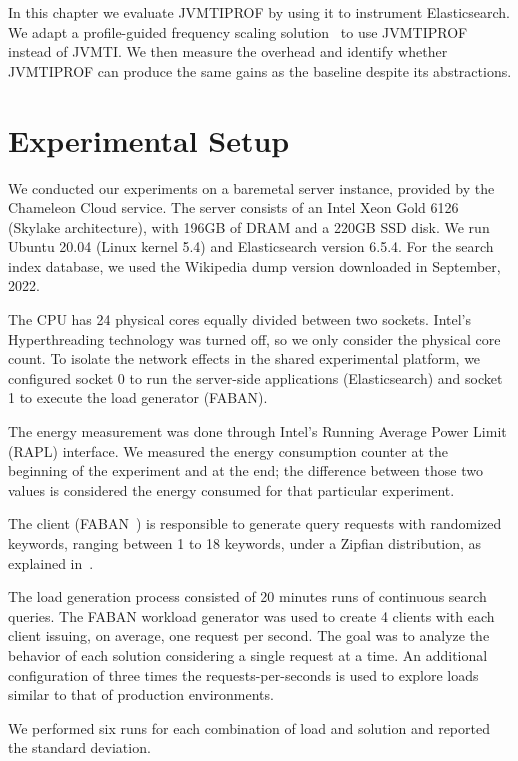 \label{cap:evaluation}

In this chapter we evaluate JVMTIPROF by using it to instrument Elasticsearch. We adapt a profile-guided frequency scaling solution~\cite{hurryupccgrid} to use JVMTIPROF instead of JVMTI. We then measure the overhead and identify whether JVMTIPROF can produce the same gains as the baseline despite its abstractions.

\section{Experimental Setup}

We conducted our experiments on a baremetal server instance, provided by the Chameleon Cloud service. The server consists of an Intel Xeon Gold 6126 (Skylake architecture), with 196GB of DRAM and a 220GB SSD disk.  We run Ubuntu 20.04 (Linux kernel 5.4) and Elasticsearch version 6.5.4. For the search index database, we used the Wikipedia dump version  downloaded in September, 2022.

The CPU has 24 physical cores equally divided between two sockets. Intel’s Hyperthreading technology was turned off, so we only consider the physical core count. To isolate the network effects in the shared experimental platform, we configured socket 0 to run the server-side applications (Elasticsearch) and socket 1 to execute the load generator (FABAN).

The energy measurement was done through Intel’s Running Average Power Limit (RAPL) interface. We measured the energy consumption counter at the beginning of the experiment and at the end; the difference between those two values is considered the energy consumed for that particular experiment.

The client (FABAN~\cite{faban}) is responsible to generate query requests with randomized keywords, ranging between 1 to 18 keywords, under a Zipfian distribution, as explained in~\cite{hurryupccgrid}.

The load generation process consisted of 20 minutes runs of continuous search queries. The FABAN workload generator was used to create 4 clients with each client issuing, on average, one request per second. The goal was to analyze the behavior of each solution considering a single request at a time. An additional configuration of three times the requests-per-seconds is used to explore loads similar to that of production environments.

We performed six runs for each combination of load and solution and reported the standard deviation.

